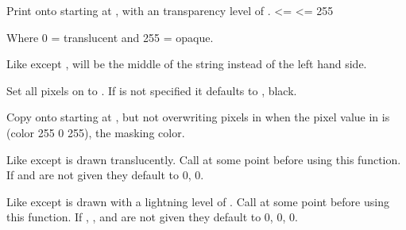 
Print  onto  starting at ,  with an transparency level of . <=  <= 255

Where 0 = translucent and 255 = opaque.


Like  except ,  will be the middle of the string instead of the left hand side.




Set all pixels on  to . If  is not specified it defaults to , black.





Copy  onto  starting at ,  but not overwriting pixels in  when the pixel value in  is (color 255 0 255), the masking color.




Like  except  is drawn translucently. Call  at some point before using this function. If  and  are not given they default to 0, 0.


Like  except  is drawn with a lightning level of . Call  at some point before using this function. If , , and  are not given they default to 0, 0, 0.


